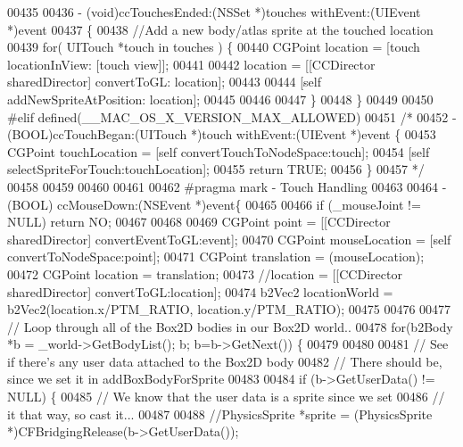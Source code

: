 \begin{DoxyCode}
{{{{{{{{00435 \textcolor{preprocessor}{}
00436 - (void)ccTouchesEnded:(NSSet *)touches withEvent:(UIEvent *)event
00437 \{
00438     \textcolor{comment}{//Add a new body/atlas sprite at the touched location}
00439     \textcolor{keywordflow}{for}( UITouch *touch in touches ) \{
00440         CGPoint location = [touch locationInView: [touch view]];
00441         
00442         location = [[CCDirector sharedDirector] convertToGL: location];
00443         
00444         [\textcolor{keyword}{self} addNewSpriteAtPosition: location];
00445         
00446         
00447     \}
00448 \}
00449 
00450 \textcolor{preprocessor}{#elif defined(\_\_MAC\_OS\_X\_VERSION\_MAX\_ALLOWED)}
00451 \textcolor{preprocessor}{}\textcolor{comment}{/*}
00452 \textcolor{comment}{- (BOOL)ccTouchBegan:(UITouch *)touch withEvent:(UIEvent *)event \{}
00453 \textcolor{comment}{    CGPoint touchLocation = [self convertTouchToNodeSpace:touch];}
00454 \textcolor{comment}{    [self selectSpriteForTouch:touchLocation];}
00455 \textcolor{comment}{    return TRUE;}
00456 \textcolor{comment}{\}}
00457 \textcolor{comment}{ */}
00458 
00459 
00460 
00461 
00462 \textcolor{preprocessor}{#pragma mark - Touch Handling}
00463 \textcolor{preprocessor}{}
00464 - (BOOL) ccMouseDown:(NSEvent *)event\{
00465     
00466     \textcolor{keywordflow}{if} (\_mouseJoint != NULL) \textcolor{keywordflow}{return} NO;
00467     
00468 
00469     CGPoint point = [[CCDirector sharedDirector] convertEventToGL:event];
00470     CGPoint mouseLocation = [\textcolor{keyword}{self} convertToNodeSpace:point];
00471     CGPoint translation = (mouseLocation);
00472     CGPoint location = translation;
00473     \textcolor{comment}{//location = [[CCDirector sharedDirector] convertToGL:location];}
00474     b2Vec2 locationWorld = b2Vec2(location.x/PTM\_RATIO, location.y/PTM\_RATIO);
00475     
00476     
00477     \textcolor{comment}{// Loop through all of the Box2D bodies in our Box2D world..}
00478     \textcolor{keywordflow}{for}(b2Body *b = \_world->GetBodyList(); b; b=b->GetNext()) \{
00479         
00480         
00481         \textcolor{comment}{// See if there's any user data attached to the Box2D body}
00482         \textcolor{comment}{// There should be, since we set it in addBoxBodyForSprite}
00483         
00484         \textcolor{keywordflow}{if} (b->GetUserData() != NULL) \{
00485             \textcolor{comment}{// We know that the user data is a sprite since we set}
00486             \textcolor{comment}{// it that way, so cast it...}
00487             
00488             \textcolor{comment}{//PhysicsSprite *sprite = (PhysicsSprite *)CFBridgingRelease(b->GetUserData());}
}}}}}}}}
\end{DoxyCode}

